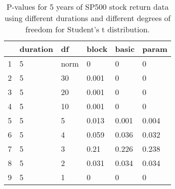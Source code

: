\begin{table}[ht]
\centering
\caption{P-values for 5 years of SP500 stock return 
                   data using different durations
  and different degrees of freedom for Student's t distribution.} 
\label{table:SP5005}
\begin{tabular}{rlllll}
  \hline
 & duration & df & block & basic & param \\ 
  \hline
1 & 5 & norm & 0 & 0 & 0 \\ 
  2 & 5 & 30 & 0.001 & 0 & 0 \\ 
  3 & 5 & 20 & 0.001 & 0 & 0 \\ 
  4 & 5 & 10 & 0.001 & 0 & 0 \\ 
  5 & 5 & 5 & 0.013 & 0.001 & 0.004 \\ 
  6 & 5 & 4 & 0.059 & 0.036 & 0.032 \\ 
  7 & 5 & 3 & 0.21 & 0.226 & 0.238 \\ 
  8 & 5 & 2 & 0.031 & 0.034 & 0.034 \\ 
  9 & 5 & 1 & 0 & 0 & 0 \\ 
   \hline
\end{tabular}
\end{table}

